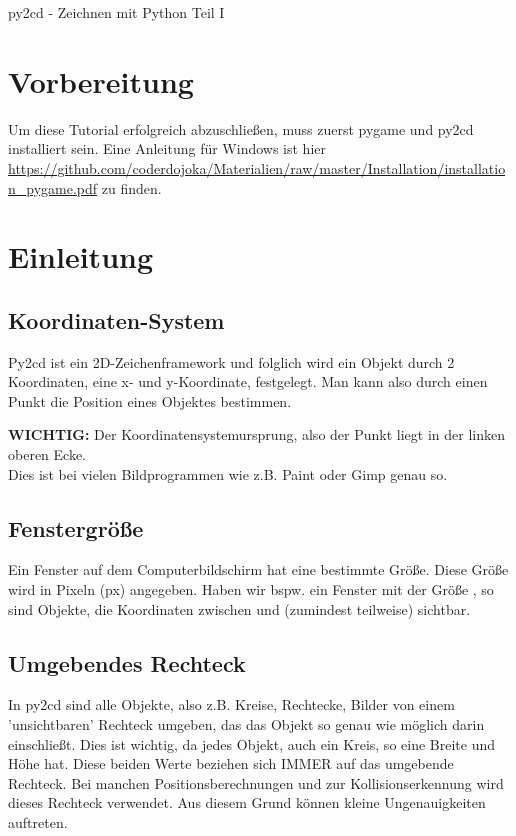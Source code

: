 \documentclass{\VorlagenPfad/coderdojokatext}
\newcommand{\Titel}{py2cd - Zeichnen mit Python Teil I}
\begin{document}
\begin{center}
	{\huge \Titel}
\end{center}

\section{Vorbereitung}
Um diese Tutorial erfolgreich abzuschließen, muss zuerst pygame und py2cd installiert sein. Eine Anleitung für Windows ist hier \url{https://github.com/coderdojoka/Materialien/raw/master/Installation/installation_pygame.pdf} zu finden.

\section{Einleitung}

\subsection{Koordinaten-System}
Py2cd ist ein 2D-Zeichenframework und folglich wird ein Objekt durch 2 Koordinaten, eine x- und y-Koordinate, festgelegt. Man kann also durch einen Punkt  die Position eines Objektes bestimmen.
\begin{merkbox}
\textbf{WICHTIG:} Der Koordinatensystemursprung, also der Punkt  liegt in der linken oberen Ecke.
\\Dies ist bei vielen Bildprogrammen wie z.B. Paint oder Gimp genau so.
\end{merkbox}

\subsection{Fenstergröße}
Ein Fenster auf dem Computerbildschirm hat eine bestimmte Größe. Diese Größe wird in Pixeln (px) angegeben. Haben wir bspw. ein Fenster mit der Größe ,
so sind Objekte, die Koordinaten zwischen  und  (zumindest teilweise) sichtbar.

\subsection{Umgebendes Rechteck}
In py2cd sind alle Objekte, also z.B. Kreise, Rechtecke, Bilder
 von einem 'unsichtbaren' Rechteck umgeben, das das Objekt so genau wie möglich darin einschließt. Dies ist wichtig, da jedes Objekt, auch ein Kreis, so eine Breite und Höhe hat. Diese beiden Werte beziehen sich IMMER auf das umgebende Rechteck. Bei manchen Positionsberechnungen und zur Kollisionserkennung wird dieses Rechteck verwendet.
  Aus diesem Grund können kleine Ungenauigkeiten auftreten.
\end{document}
